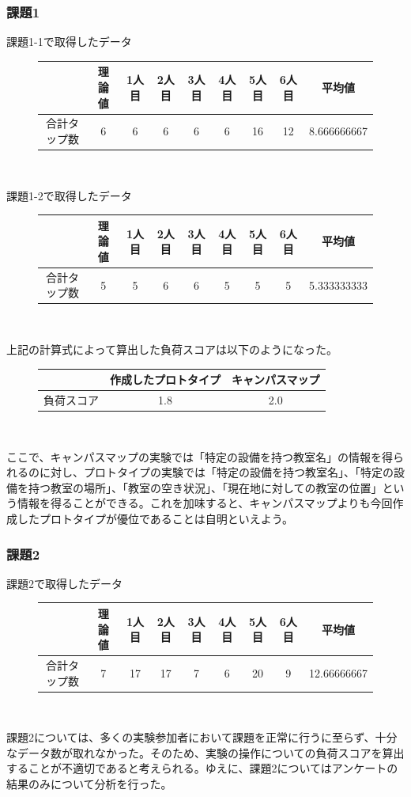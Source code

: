 \documentclass[12pt,a4paper,dvipdf]{jsarticle}
\begin{document}
\subsubsection{課題1}
課題1-1で取得したデータ\\
\begin{figure}[H]
    \centering
    \begin{tabular}{c|c|c|c|c|c|c|c|c}
               & 理論値 & 1人目 & 2人目 & 3人目 & 4人目 & 5人目 & 6人目 & 平均値         \\
        \hline
        合計タップ数 & 6   & 6   & 6   & 6   & 6   & 16  & 12  & 8.666666667
    \end{tabular}\\
\end{figure}
課題1-2で取得したデータ\\
\begin{figure}[H]
    \centering
    \begin{tabular}{c|c|c|c|c|c|c|c|c}
               & 理論値 & 1人目 & 2人目 & 3人目 & 4人目 & 5人目 & 6人目 & 平均値         \\
        \hline
        合計タップ数 & 5   & 5   & 6   & 6   & 5   & 5   & 5   & 5.333333333
    \end{tabular}\\
\end{figure}
上記の計算式によって算出した負荷スコアは以下のようになった。
\begin{figure}[H]
    \centering
    \begin{tabular}{c|cc}
              & 作成したプロトタイプ & キャンパスマップ \\
        \hline
        負荷スコア & 1.8        & 2.0
    \end{tabular}\\
\end{figure}
ここで、キャンパスマップの実験では「特定の設備を持つ教室名」の情報を得られるのに対し、プロトタイプの実験では「特定の設備を持つ教室名」、「特定の設備を持つ教室の場所」、「教室の空き状況」、「現在地に対しての教室の位置」という情報を得ることができる。これを加味すると、キャンパスマップよりも今回作成したプロトタイプが優位であることは自明といえよう。
\subsubsection{課題2}
課題2で取得したデータ\\
\begin{figure}[H]
    \centering
    \begin{tabular}{c|c|c|c|c|c|c|c|c}
               & 理論値 & 1人目 & 2人目 & 3人目 & 4人目 & 5人目 & 6人目 & 平均値         \\
        \hline
        合計タップ数 & 7   & 17  & 17  & 7   & 6   & 20  & 9   & 12.66666667
    \end{tabular}\\
\end{figure}
課題2については、多くの実験参加者において課題を正常に行うに至らず、十分なデータ数が取れなかった。そのため、実験の操作についての負荷スコアを算出することが不適切であると考えられる。ゆえに、課題2についてはアンケートの結果のみについて分析を行った。
\end{document}
